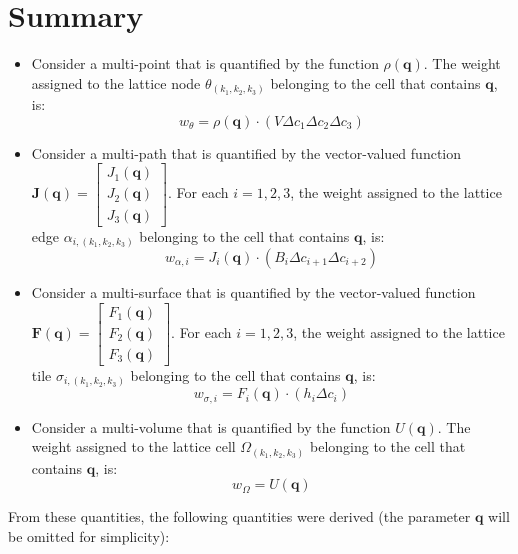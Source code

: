 \section{Summary}

\begin{itemize}
\item Consider a multi-point that is quantified by the function \(\rho(\mathbf{q})\). The weight assigned to the lattice node \(\theta_{(k_1,k_2,k_3)}\) belonging to the cell that contains \(\mathbf{q}\), is: 
\[w_{\theta} = \rho(\mathbf{q}) \cdot (V \Delta c_1 \Delta c_2 \Delta c_3)\]
\item Consider a multi-path that is quantified by the vector-valued function \(\mathbf{J}(\mathbf{q}) = \begin{bmatrix} J_1(\mathbf{q}) \\ J_2(\mathbf{q}) \\ J_3(\mathbf{q}) \end{bmatrix}\). For each \(i = 1,2,3\), the weight assigned to the lattice edge \(\alpha_{i, (k_1,k_2,k_3)}\) belonging to the cell that contains \(\mathbf{q}\), is:      
\[w_{\alpha,i} = J_i(\mathbf{q}) \cdot (B_i \Delta c_{i+1} \Delta c_{i+2})\]
\item Consider a multi-surface that is quantified by the vector-valued function \(\mathbf{F}(\mathbf{q}) = \begin{bmatrix} F_1(\mathbf{q}) \\ F_2(\mathbf{q}) \\ F_3(\mathbf{q}) \end{bmatrix}\). For each \(i = 1,2,3\), the weight assigned to the lattice tile \(\sigma_{i, (k_1,k_2,k_3)}\) belonging to the cell that contains \(\mathbf{q}\), is:      
\[w_{\sigma,i} = F_i(\mathbf{q}) \cdot (h_i \Delta c_i)\]
\item Consider a multi-volume that is quantified by the function \(U(\mathbf{q})\). The weight assigned to the lattice cell \(\Omega_{(k_1,k_2,k_3)}\) belonging to the cell that contains \(\mathbf{q}\), is: 
\[w_{\Omega} = U(\mathbf{q})\]
\end{itemize}

From these quantities, the following quantities were derived (the parameter \(\mathbf{q}\) will be omitted for simplicity):

